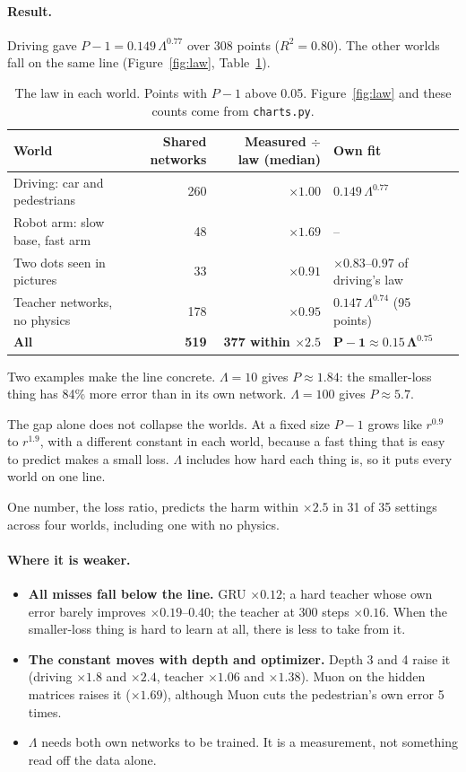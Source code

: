 \documentclass[11pt]{article}
\newcommand{\Lam}{\Lambda}
\newcommand{\para}[1]{\paragraph{#1}}
\begin{document}
\para{Result.} Driving gave $P-1 = 0.149\,\Lam^{0.77}$ over 308 points ($R^2=0.80$). The other worlds fall on the same line (Figure~\ref{fig:law}, Table~\ref{tab:law}).

\begin{table}[h]
\centering\small
\caption{The law in each world. Points with $P-1$ above 0.05. Figure~\ref{fig:law} and these counts come from \texttt{charts.py}.}
\label{tab:law}
\setlength{\tabcolsep}{3.5pt}
\begin{tabular}{@{}lrrl@{}}
\toprule
World & Shared networks & Measured $\div$ law (median) & Own fit \\
\midrule
Driving: car and pedestrians & 260 & $\times1.00$ & $0.149\,\Lam^{0.77}$ \\
Robot arm: slow base, fast arm & 48 & $\times1.69$ & -- \\
Two dots seen in pictures & 33 & $\times0.91$ & $\times0.83$--$0.97$ of driving's law \\
Teacher networks, no physics & 178 & $\times0.95$ & $0.147\,\Lam^{0.74}$ (95 points) \\
\midrule
\textbf{All} & \textbf{519} & \textbf{377 within $\times2.5$} & $\mathbf{P-1\approx 0.15\,\Lam^{0.75}}$ \\
\bottomrule
\end{tabular}
\end{table}

Two examples make the line concrete. $\Lam=10$ gives $P\approx1.84$: the smaller-loss thing has 84\% more error than in its own network. $\Lam=100$ gives $P\approx5.7$.

The gap alone does not collapse the worlds. At a fixed size $P-1$ grows like $r^{0.9}$ to $r^{1.9}$, with a different constant in each world, because a fast thing that is easy to predict makes a small loss. $\Lam$ includes how hard each thing is, so it puts every world on one line.

\begin{takeaway}
One number, the loss ratio, predicts the harm within $\times2.5$ in 31 of 35 settings across four worlds, including one with no physics.
\end{takeaway}

\para{Where it is weaker.}
\begin{itemize}
\item \textbf{All misses fall below the line.} GRU $\times0.12$; a hard teacher whose own error barely improves $\times0.19$--$0.40$; the teacher at 300 steps $\times0.16$. When the smaller-loss thing is hard to learn at all, there is less to take from it.
\item \textbf{The constant moves with depth and optimizer.} Depth 3 and 4 raise it (driving $\times1.8$ and $\times2.4$, teacher $\times1.06$ and $\times1.38$). Muon on the hidden matrices raises it ($\times1.69$), although Muon cuts the pedestrian's own error 5 times.
\item $\Lam$ needs both own networks to be trained. It is a measurement, not something read off the data alone.
\end{itemize}
\end{document}
